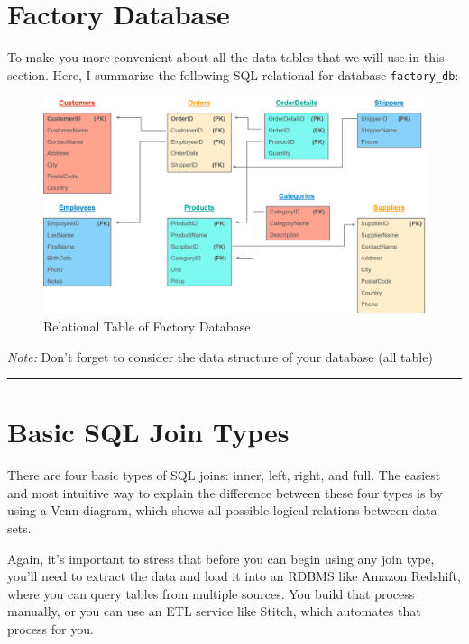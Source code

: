 \documentclass[
]{book}
\begin{document}
\hypertarget{factory-database}{%
\section{Factory Database}\label{factory-database}}

To make you more convenient about all the data tables that we will use in this section. Here, I summarize the following SQL relational for database \texttt{factory\_db}:

\begin{figure}

{\centering \includegraphics[width=1\linewidth]{./images/Bab5/fullrelational} 

}

\caption{Relational Table of Factory Database}\label{fig:fullrelational}
\end{figure}

\emph{Note:} Don't forget to consider the data structure of your database (all table)

\begin{center}\rule{0.5\linewidth}{0.5pt}\end{center}

\hypertarget{basic-sql-join-types}{%
\section{Basic SQL Join Types}\label{basic-sql-join-types}}

There are four basic types of SQL joins: inner, left, right, and full. The easiest and most intuitive way to explain the difference between these four types is by using a Venn diagram, which shows all possible logical relations between data sets.

Again, it's important to stress that before you can begin using any join type, you'll need to extract the data and load it into an RDBMS like Amazon Redshift, where you can query tables from multiple sources. You build that process manually, or you can use an ETL service like Stitch, which automates that process for you.
\end{document}
